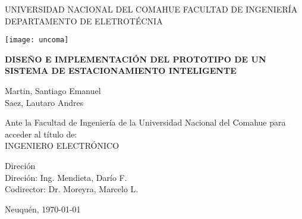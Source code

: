 \begin{titlepage}
    \begin{center}
        UNIVERSIDAD NACIONAL DEL COMAHUE
        FACULTAD DE INGENIERÍA
        DEPARTAMENTO DE ELETROTÉCNIA

        \vspace*{1cm}
        \texttt{[image: uncoma]}
        \vspace*{1cm}

        \begin{large}
            \uppercase{\textbf{Diseño e implementación del prototipo de un sistema de estacionamiento inteligente}}
        \end{large}

        \vspace*{1.5cm}

        Martin, Santiago Emanuel \\
        Saez, Lautaro Andres

        \vspace*{1cm}

        Ante la Facultad de Ingeniería de la Universidad Nacional del Comahue para
        acceder al título de:\\
        INGENIERO ELECTRÓNICO

        \vspace*{0.8cm}

        Direción\\
        Direción: Ing. Mendieta, Darío F. \\
        Codirector: Dr. Moreyra, Marcelo L.

        \vspace*{1cm}
        Neuquén, \today


    \end{center}
\end{titlepage}